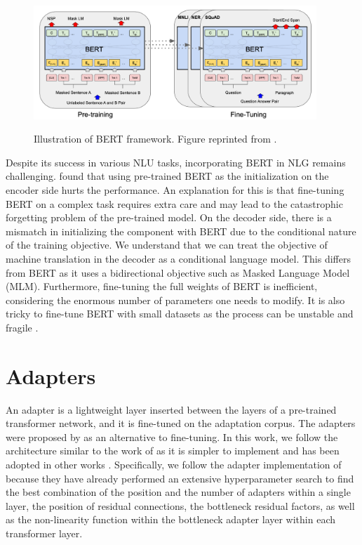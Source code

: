 \begin{figure}[h]
    {\includegraphics[width=0.95\textwidth]{img/bert.png}}
    \centering
    \caption{Illustration of BERT framework. Figure reprinted from .}
    \label{img:bert}
\end{figure}

Despite its success in various NLU tasks, incorporating BERT in NLG remains challenging.  found that using pre-trained BERT as the initialization on the encoder side hurts the performance. An explanation for this is that fine-tuning BERT on a complex task requires extra care and may lead to the catastrophic forgetting problem  of the pre-trained model. On the decoder side, there is a mismatch in initializing the component with BERT due to the conditional nature of the training objective. We understand that we can treat the objective of machine translation in the decoder as a conditional language model. This differs from BERT as it uses a bidirectional objective such as Masked Language Model (MLM). Furthermore, fine-tuning the full weights of BERT is inefficient, considering the enormous number of parameters one needs to modify. It is also tricky to fine-tune BERT with small datasets as the process can be unstable and fragile .

\section{Adapters}
\label{sec:bm_adapters}
An adapter is a lightweight layer inserted between the layers of a pre-trained transformer network, and it is fine-tuned on the adaptation corpus. The adapters were proposed by  as an alternative to fine-tuning. In this work, we follow the architecture similar to the work of  as it is simpler to implement and has been adopted in other works . Specifically, we follow the adapter implementation of  because they have already performed an extensive hyperparameter search to find the best combination of the position and the number of adapters within a single layer, the position of residual connections, the bottleneck residual factors, as well as the non-linearity function within the bottleneck adapter layer within each transformer layer.

